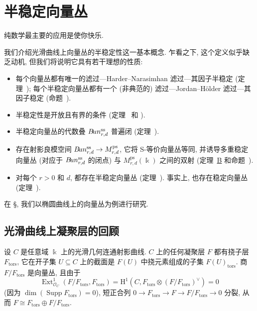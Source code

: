 \section{半稳定向量丛}\label{src:9.1}
\begin{epigraph}
纯数学最主要的应用是使你快乐.
\end{epigraph}
我们介绍光滑曲线上向量丛的半稳定性这一基本概念. 乍看之下, 这个定义似乎缺乏动机, 但我们将说明它具有若干理想的性质:
\begin{itemize}
\item 每个向量丛都有唯一的滤过---Harder--Narasimhan 滤过---其因子半稳定 (定理~); 每个半稳定向量丛都有一个 (非典范的) 滤过---Jordan--H\"older 滤过---其因子稳定 (命题~).
\item 半稳定性是开放且有界的条件 (定理~ 和 ).
\item 半稳定向量丛的代数叠 $B\!un_{r,d}^{\mathrm{ss}}$ 普遍闭 (定理~).
\item 存在射影良模空间 $B\!un_{r,d}^{\mathrm{ss}}\to M_{r,d}^{\mathrm{ps}}$, 它将 S-等价向量丛等同, 并诱导多重稳定向量丛 (对应于 $B\!un_{r,d}^{\mathrm{ss}}$ 的闭点) 与 $M_{r,d}^{\mathrm{ps}}(\Bbbk)$ 之间的双射 (定理~\hyperref[thm:B]{B} 和命题~).
\item 对每个 $r>0$ 和 $d$, 都存在半稳定向量丛 (定理~). 事实上, 也存在稳定向量丛 (定理~).
\end{itemize}
在 \S{}, 我们以椭圆曲线上的向量丛为例进行研究.
\subsection{光滑曲线上凝聚层的回顾}\label{src:9.1.1-subsection}
设 $C$ 是任意域 $\Bbbk$ 上的光滑几何连通射影曲线. $C$ 上的任何凝聚层 $F$ 都有挠子层 $F_{\mathrm{tors}}$, 它在开子集 $U\subseteq C$ 上的截面是 $F(U)$ 中挠元素组成的子集 $F(U)_{\mathrm{tors}}$. 商 $F/F_{\mathrm{tors}}$ 是向量丛, 且由于
\[
\operatorname{Ext}_{\mathcal O_C}^1(F/F_{\mathrm{tors}},F_{\mathrm{tors}})
=\mathrm H^1(C,F_{\mathrm{tors}}\otimes(F/F_{\mathrm{tors}})^\vee)=0
\]
(因为 $\dim(\operatorname{Supp}F_{\mathrm{tors}})=0$), 短正合列 $0\to F_{\mathrm{tors}}\to F\to F/F_{\mathrm{tors}}\to0$ 分裂, 从而 $F\cong F_{\mathrm{tors}}\oplus F/F_{\mathrm{tors}}$.

